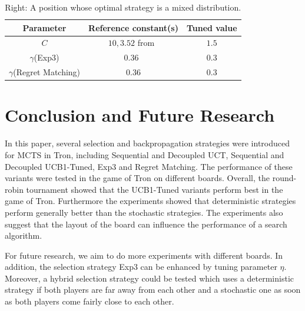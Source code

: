 \documentclass{article}
\begin{document}
\begin{table}
\begin{minipage}{.4\textwidth}
\begin{tabular}{|c||c|c|}
							\hline
Parameter			& Reference constant(s)                             & Tuned value	\\ \hline\hline
    $C$				& $10,3.52$ from~\cite{teuling_tron,cig_paper}	& $1.5$		\\ \hline
$\gamma$(Exp3) & 0.36~\cite{cig_paper}		& 0.3		\\ \hline
$\gamma$(Regret Matching)	& 0.36				& 0.3		\\ \hline
\end{tabular}
\caption{Right: A position whose optimal strategy is a mixed distribution.}
\label{fig:example_avgs}
\end{minipage}
\end{table}

\section{Conclusion and Future Research}
\label{sec:conclusion}

In this paper, several selection and backpropagation strategies were introduced for MCTS in Tron, including Sequential and Decoupled UCT, Sequential and Decoupled UCB1-Tuned, Exp3 and Regret Matching. 
The performance of these variants were tested in the game of Tron on different boards.
Overall, the round-robin tournament showed that the UCB1-Tuned variants perform best in the game of Tron. 
Furthermore the experiments showed that deterministic strategies perform generally better than the stochastic strategies.
The experiments also suggest that the layout of the board can influence the performance of a search algorithm.

For future research, we aim to do more experiments with different boards. 
In addition, the selection strategy Exp3 can be enhanced by tuning parameter $\eta$.
Moreover, a hybrid selection strategy could be tested which uses a deterministic strategy if both players are far away from each other and a stochastic one as soon as both players come fairly close to each other. 



\end{document}
